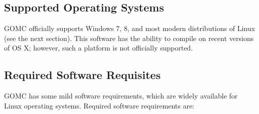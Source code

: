 \subsection{Supported Operating Systems}

GOMC officially supports Windows 7, 8, and most modern distributions of Linux (see the next section).  This software has the ability to compile on recent versions of OS X; however, such a platform is not officially supported. 

\subsection{Required Software Requisites}

GOMC has some mild software requirements, which are widely available for Linux operating systems.  Required software requirements are:\\\\
